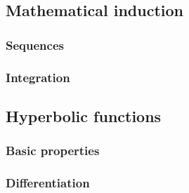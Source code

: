 \documentclass{article}
\begin{document}
\subsection{Mathematical induction}

\subsubsection{Sequences}


\subsubsection{Integration}



\subsection{Hyperbolic functions}

\subsubsection{Basic properties}


\subsubsection{Differentiation}

\end{document}
